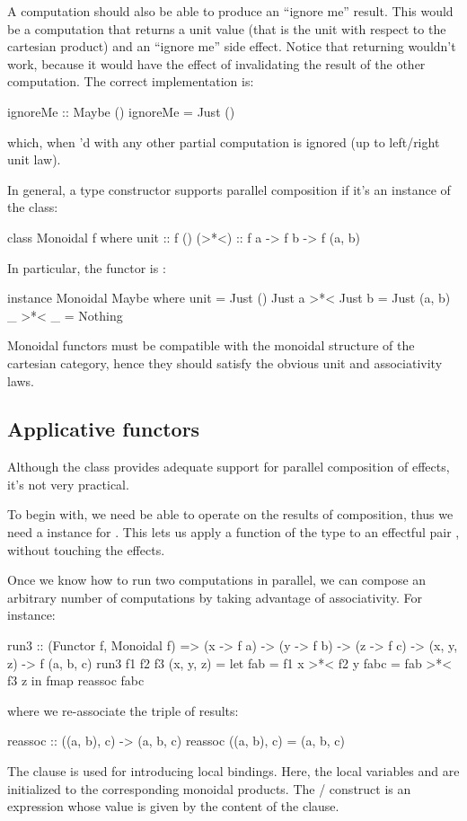 \documentclass[DaoFP]{subfiles}
\begin{document}
A computation should also be able to produce an ``ignore me'' result. This would be a computation that returns a unit value (that is the unit with respect to the cartesian product) and an ``ignore me'' side effect. Notice that returning  wouldn't work, because it would have the effect of invalidating the result of the other computation. The correct implementation is:
\begin{haskell}
ignoreMe :: Maybe ()
ignoreMe = Just ()
\end{haskell}
which, when 'd with any other partial computation is ignored (up to left/right unit law).

In general, a type constructor  supports parallel composition if it's an instance of the  class:
\begin{haskell}
class Monoidal f where
  unit  :: f ()
  (>*<) :: f a -> f b -> f (a, b)
\end{haskell}
In particular, the  functor is :
\begin{haskell}
instance Monoidal Maybe where
  unit  = Just ()
  Just a >*< Just b = Just (a, b)
  _ >*< _ = Nothing
\end{haskell}
Monoidal functors must be compatible with the monoidal structure of the cartesian category, hence they should satisfy the obvious unit and associativity laws.

\subsection{Applicative functors}

Although the class  provides adequate support for parallel composition of effects, it's not very practical. 

To begin with, we need be able to operate on the results of composition, thus we need a  instance for . This lets us apply a function of the type  to an effectful pair , without touching the effects. 

Once we know how to run two computations in parallel, we can compose an arbitrary number of computations by taking advantage of associativity. For instance:
\begin{haskell}
run3 :: (Functor f, Monoidal f) => 
  (x -> f a) -> (y -> f b) -> (z -> f c) -> 
  (x, y, z) -> f (a, b, c)
run3 f1 f2 f3 (x, y, z) =
  let fab  = f1 x >*< f2 y
      fabc = fab >*< f3 z
  in fmap reassoc fabc
\end{haskell}
where we re-associate the triple of results:
\begin{haskell}
reassoc :: ((a, b), c) -> (a, b, c)
reassoc ((a, b), c) = (a, b, c)
\end{haskell}
The  clause is used for introducing local bindings. Here, the local variables  and  are initialized to the corresponding monoidal products. The / construct is an expression whose value is given by the content of the  clause.
\end{document}
